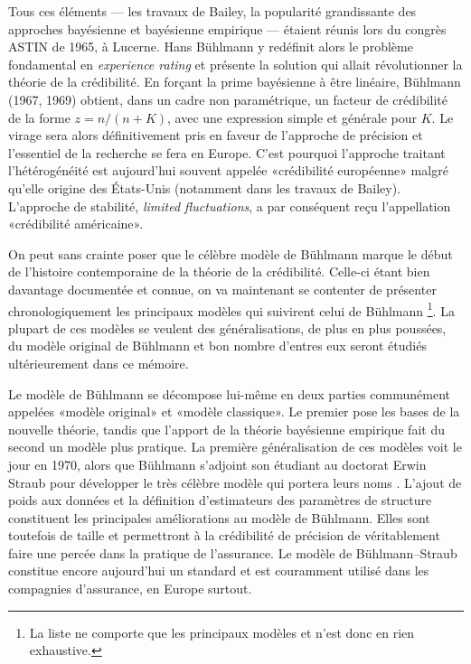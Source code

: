 Tous ces éléments --- les travaux de Bailey, la popularité
grandissante des approches bayésienne et bayésienne empirique ---
étaient réunis lors du congrès ASTIN de 1965, à Lucerne. Hans
Bühlmann y redéfinit alors le problème fondamental en \emph{experience
  rating} et présente la solution qui allait révolutionner la théorie
de la crédibilité. En forçant la prime bayésienne à être linéaire,
Bühlmann (1967, 1969) obtient, dans un cadre non paramétrique, un
facteur de crédibilité de la forme $z = n/(n+K)$, avec une expression
simple et générale pour $K$. Le virage sera alors définitivement pris
en faveur de l'approche de précision et l'essentiel de la recherche se
fera en Europe. C'est pourquoi l'approche traitant l'hétérogénéité est
aujourd'hui souvent appelée «crédibilité européenne» malgré qu'elle
origine des États-Unis (notamment dans les travaux de Bailey).
L'approche de stabilité, \emph{limited fluctuations}, a par conséquent
reçu l'appellation «crédibilité américaine».

On peut sans crainte poser que le célèbre modèle de Bühlmann
marque le début de l'histoire contemporaine de la théorie de la
crédibilité. Celle-ci étant bien davantage documentée et connue, on va
maintenant se contenter de présenter chronologiquement les principaux
modèles qui suivirent celui de Bühlmann%
\footnote{La liste ne comporte que les principaux modèles et n'est
  donc en rien exhaustive.}. %
La plupart de ces modèles se veulent des généralisations, de plus en
plus poussées, du modèle original de Bühlmann et bon nombre d'entres
eux seront étudiés ultérieurement dans ce mémoire.

Le modèle de Bühlmann se décompose lui-même en deux parties
communément appelées «modèle original» et «modèle classique». Le
premier pose les bases de la nouvelle théorie, tandis que l'apport de
la théorie bayésienne empirique fait du second un modèle plus
pratique. La première généralisation de ces modèles voit le jour en
1970, alors que Bühlmann s'adjoint son étudiant au doctorat Erwin
Straub pour développer le très célèbre modèle qui portera leurs noms
\citep{BuhlmannStraub:1970}. L'ajout de poids aux données et la
définition d'estimateurs des paramètres de structure constituent les
principales améliorations au modèle de Bühlmann. Elles sont toutefois
de taille et permettront à la crédibilité de précision de
véritablement faire une percée dans la pratique de l'assurance. Le
modèle de Bühlmann--Straub constitue encore aujourd'hui un standard et
est couramment utilisé dans les compagnies d'assurance, en Europe
surtout.

